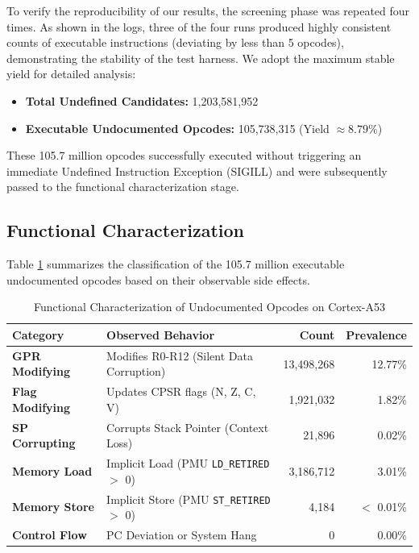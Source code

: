 \documentclass[pdflatex,sn-mathphys]{sn-jnl}%
\theoremstyle{thmstyleone}%
\theoremstyle{thmstyletwo}%
\theoremstyle{thmstylethree}%
\begin{document}
To verify the reproducibility of our results, the screening phase was repeated four times. As shown in the logs, three of the four runs produced highly consistent counts of executable instructions (deviating by less than 5 opcodes), demonstrating the stability of the test harness. We adopt the maximum stable yield for detailed analysis:
\begin{itemize}
    \item \textbf{Total Undefined Candidates:} 1,203,581,952
    \item \textbf{Executable Undocumented Opcodes:} 105,738,315 (Yield $\approx 8.79\%$)
\end{itemize}
These 105.7 million opcodes successfully executed without triggering an immediate Undefined Instruction Exception (SIGILL) and were subsequently passed to the functional characterization stage.

\subsection{Functional Characterization}
Table \ref{tab:results} summarizes the classification of the 105.7 million executable undocumented opcodes based on their observable side effects.

\begin{table}[h]
\centering
\caption{Functional Characterization of Undocumented Opcodes on Cortex-A53}
\label{tab:results}
\begin{tabular}{@{}llrr@{}}
\toprule
\textbf{Category} & \textbf{Observed Behavior} & \textbf{Count} & \textbf{Prevalence} \\ \midrule
\textbf{GPR Modifying} & Modifies R0-R12 (Silent Data Corruption) & 13,498,268 & 12.77\% \\
\textbf{Flag Modifying} & Updates CPSR flags (N, Z, C, V) & 1,921,032 & 1.82\% \\
\textbf{SP Corrupting} & Corrupts Stack Pointer (Context Loss) & 21,896 & 0.02\% \\
\textbf{Memory Load} & Implicit Load (PMU \texttt{LD\_RETIRED} $>$ 0) & 3,186,712 & 3.01\% \\
\textbf{Memory Store} & Implicit Store (PMU \texttt{ST\_RETIRED} $>$ 0) & 4,184 & $<$ 0.01\% \\
\textbf{Control Flow} & PC Deviation or System Hang & 0 & 0.00\% \\ 
\bottomrule
\end{tabular}
\end{table}
\end{document}
